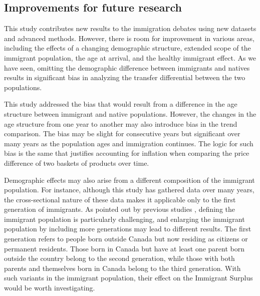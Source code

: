 

\subsection{Improvements for future research}
This study contributes new results to the immigration debates using new datasets and advanced methods.
However, there is room for improvement in various areas, including the effects of a changing demographic structure, extended scope of the immigrant population, the age at arrival, and the healthy immigrant effect.
As we have seen, omitting the demographic difference between immigrants and natives results in significant bias in analyzing the transfer differential between the two populations.

\vspace{0.7em}\par
This study addressed the bias that would result from a difference in the age structure between immigrant and native populations. However, the changes in the age structure from one year to another may also introduce bias in the trend comparison. The bias may be slight for consecutive years but significant over many years as the population ages and immigration continues.
The logic for such bias is the same that justifies accounting for inflation when comparing the price difference of two baskets of products over time.

\vspace{0.7em}\par
Demographic effects may also arise from a different composition of the immigrant population.
For instance, although this study has gathered data over many years, the cross-sectional nature of these data makes it applicable only to the first generation of immigrants.
As pointed out by previous studies \citep{Lee:1998fs}, defining the immigrant population is particularly challenging, and enlarging the immigrant population by including more generations may lead to different results.
The first generation refers to people born outside Canada but now residing as citizens or permanent residents.
Those born in Canada but have at least one parent born outside the country belong to the second generation, while those with both parents and themselves born in Canada belong to the third generation.
With such variants in the immigrant population, their effect on the Immigrant Surplus would be worth investigating.

